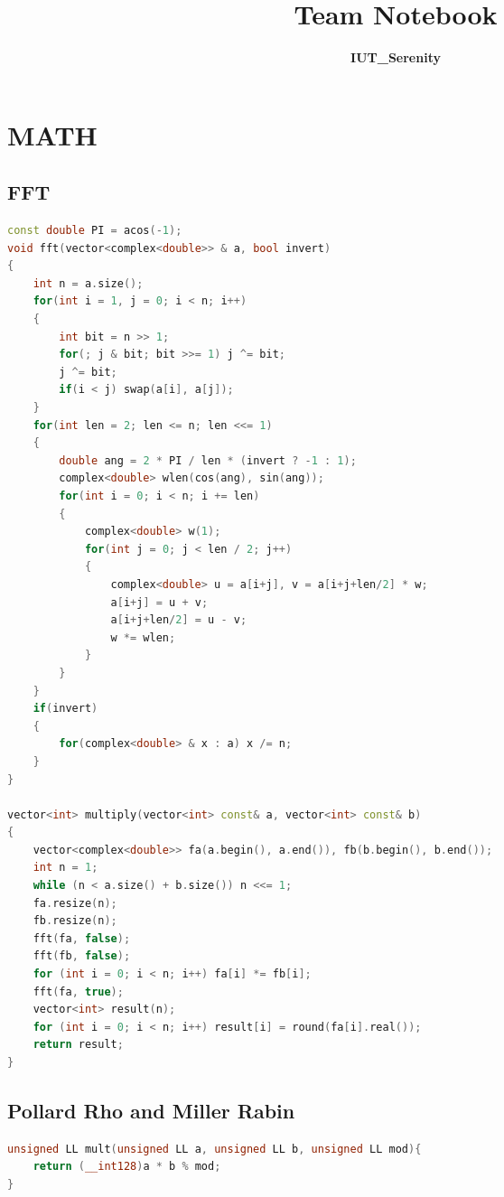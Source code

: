 \documentclass[10pt,a4paper,landscape]{article}
\title{\textbf{Team Notebook}}
\author{\textbf{IUT\_Serenity}}
\date{}
\begin{document}
\maketitle
\begin{multicols}{3}
    \begin{center} 
        \tableofcontents
    \end{center}
\pagebreak
    
\section{MATH}

\subsection{FFT}
\begin{lstlisting}[language = C++, breaklines = true]
const double PI = acos(-1);
void fft(vector<complex<double>> & a, bool invert)
{
    int n = a.size();
    for(int i = 1, j = 0; i < n; i++)
    {
        int bit = n >> 1;
        for(; j & bit; bit >>= 1) j ^= bit;
        j ^= bit;
        if(i < j) swap(a[i], a[j]);
    }
    for(int len = 2; len <= n; len <<= 1)
    {
        double ang = 2 * PI / len * (invert ? -1 : 1);
        complex<double> wlen(cos(ang), sin(ang));
        for(int i = 0; i < n; i += len)
        {
            complex<double> w(1);
            for(int j = 0; j < len / 2; j++)
            {
                complex<double> u = a[i+j], v = a[i+j+len/2] * w;
                a[i+j] = u + v;
                a[i+j+len/2] = u - v;
                w *= wlen;
            }
        }
    }
    if(invert)
    {
        for(complex<double> & x : a) x /= n;
    }
}

vector<int> multiply(vector<int> const& a, vector<int> const& b)
{
    vector<complex<double>> fa(a.begin(), a.end()), fb(b.begin(), b.end());
    int n = 1;
    while (n < a.size() + b.size()) n <<= 1;
    fa.resize(n);
    fb.resize(n);
    fft(fa, false);
    fft(fb, false);
    for (int i = 0; i < n; i++) fa[i] *= fb[i];
    fft(fa, true);
    vector<int> result(n);
    for (int i = 0; i < n; i++) result[i] = round(fa[i].real());
    return result;
}
\end{lstlisting}

\subsection{Pollard Rho and Miller Rabin}
\begin{lstlisting}[language=C++,breaklines=true]
unsigned LL mult(unsigned LL a, unsigned LL b, unsigned LL mod){
    return (__int128)a * b % mod;
}


\end{lstlisting}
\end{multicols}
\end{document}
